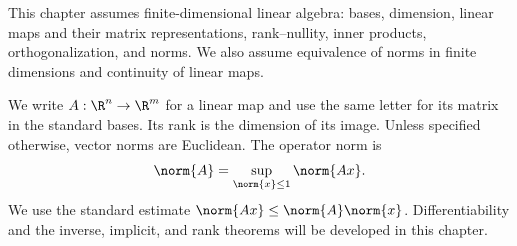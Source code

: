 This chapter assumes finite-dimensional linear algebra: bases, dimension,
linear maps and their matrix representations, rank--nullity, inner products,
orthogonalization, and norms. We also assume equivalence of norms in finite dimensions
and continuity of linear maps.

We write $A:\R^{n}\to\R^{m}$ for a linear map and use the same letter for its
matrix in the standard bases. Its rank is the dimension of its image.
Unless specified otherwise, vector norms are Euclidean. The operator norm is
\[
  \norm{A} = \sup_{\norm{x}\leq 1}\norm{Ax}.
\]
We use the standard estimate $\norm{Ax}\leq\norm{A}\norm{x}$.
Differentiability and the inverse, implicit, and rank theorems
will be developed in this chapter.
